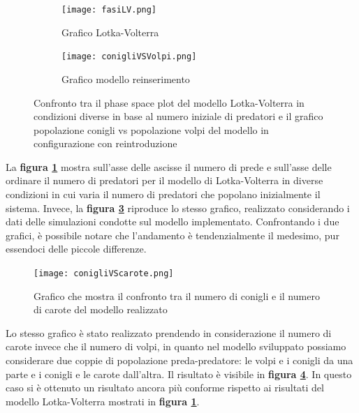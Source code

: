 \documentclass[11pt]{article}
\begin{document}
\begin{figure}[h!]
	\hspace{-5mm}
	\begin{subfigure}{.5\textwidth}
    \centering
     \texttt{[image: fasiLV.png]}
     \caption{Grafico Lotka-Volterra}
     \label{fig:LVPhaseSpace}
	\end{subfigure}
	\begin{subfigure}{.5\textwidth}
		\hspace{10mm}
		\centering
     \texttt{[image: conigliVSVolpi.png]}
     \caption{Grafico modello reinserimento}
     \label{fig:conigliVolpi}
	\end{subfigure}
	\caption{Confronto tra il phase space plot del modello Lotka-Volterra in condizioni diverse in base al numero iniziale di predatori e il grafico popolazione conigli vs popolazione volpi del modello in configurazione con reintroduzione}
\end{figure}
\begin{figure}[h!]
     
\end{figure}

\newpage 

La \textbf{figura \ref{fig:LVPhaseSpace}} mostra sull'asse delle ascisse il numero di prede e sull'asse delle ordinare il numero di predatori per il modello di Lotka-Volterra in diverse condizioni in cui varia il numero di predatori che popolano inizialmente il sistema. Invece, la \textbf{figura \ref{fig:conigliVolpi}} riproduce lo stesso grafico, realizzato considerando i dati delle simulazioni condotte sul modello implementato. Confrontando i due grafici, è possibile notare che l'andamento è tendenzialmente il medesimo, pur essendoci delle piccole differenze. 


\begin{figure}[h!]
     \centering
     \texttt{[image: conigliVScarote.png]}
     \caption{Grafico che mostra il confronto tra il numero di conigli e il numero di carote del modello realizzato}
     \label{fig:conigliCarote}
\end{figure}


\newpage 


Lo stesso grafico è stato realizzato prendendo in considerazione il numero di carote invece che il numero di volpi, in quanto nel modello sviluppato possiamo considerare due coppie di popolazione preda-predatore: le volpi e i conigli da una parte e i conigli e le carote dall'altra.  
Il risultato è visibile in \textbf{figura \ref{fig:conigliCarote}}. In questo caso si è ottenuto un risultato ancora più conforme rispetto ai risultati del modello Lotka-Volterra mostrati in \textbf{figura \ref{fig:LVPhaseSpace}}.
\end{document}

